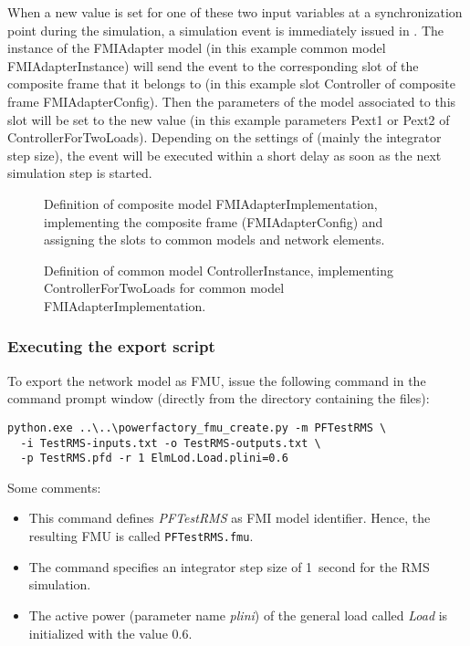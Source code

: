 When a new value is set for one of these two input variables at a synchronization point during the simulation, a simulation event is immediately issued in \pf.
The instance of the FMIAdapter model (in this example common model FMIAdapterInstance) will send the event to the corresponding slot of the composite frame that it belongs to (in this example slot Controller of composite frame FMIAdapterConfig).
Then the parameters of the model associated to this slot will be set to the new value (in this example parameters Pext1 or Pext2 of \dslmodel ControllerForTwoLoads).
Depending on the settings of \pf (mainly the integrator step size), the event will be executed within a short delay as soon as the next simulation step is started.

\begin{figure}[h!]
\vspace*{2em}
\caption{Definition of composite model FMIAdapterImplementation, implementing the composite frame (FMIAdapterConfig) and assigning the slots to common models and network elements.}
\label{fig:fmiadapterconfig_composite_model}
\end{figure}

\newpage

\begin{figure}[h!]
\vspace*{2em}
\caption{Definition of common model ControllerInstance, implementing \dslmodel ControllerForTwoLoads for common model FMIAdapterImplementation.}
\label{fig:controllerinstance}
\end{figure}

\subsubsection*{Executing the export script}

To export the network model as FMU, issue the following command in the command prompt window (directly from the directory  containing the files):
\begin{verbatim}
python.exe ..\..\powerfactory_fmu_create.py -m PFTestRMS \
  -i TestRMS-inputs.txt -o TestRMS-outputs.txt \
  -p TestRMS.pfd -r 1 ElmLod.Load.plini=0.6
\end{verbatim}
Some comments:
\begin{itemize}
  \item This command defines \emph{PFTestRMS} as FMI model identifier.
  Hence, the resulting FMU is called \texttt{PFTestRMS.fmu}.
  \item The command specifies an integrator step size of 1~second for the RMS simulation.
  \item The active power (parameter name \emph{plini}) of the general load called \emph{Load} is initialized with the value $0.6$.
\end{itemize}


